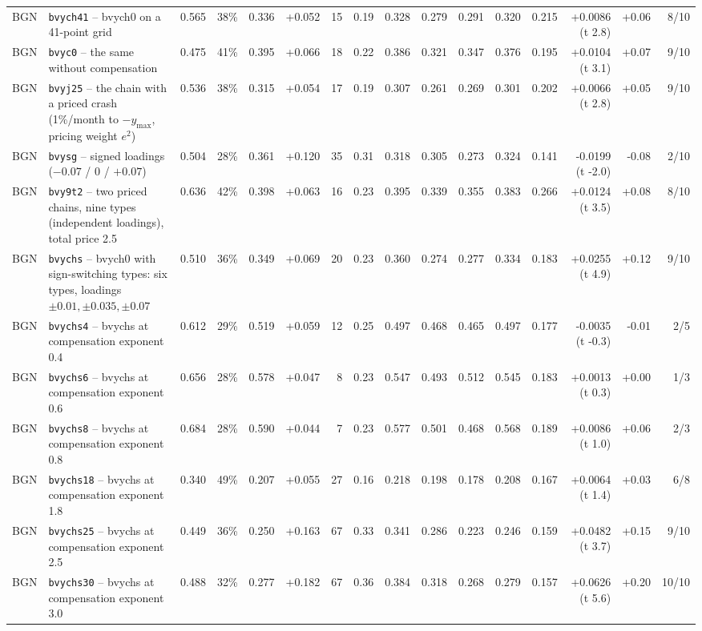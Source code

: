 \begin{landscape}
\begin{longtable}{lp{4.6cm}rrrrrrrrrrrrrr}
BGN & \texttt{bvych41} -- bvych0 on a 41-point grid & 0.565 & 38\% & 0.336 & +0.052 & 15 & 0.19 & 0.328 & 0.279 & 0.291 & 0.320 & 0.215 & +0.0086 (t 2.8) & +0.06 & 8/10 \\
BGN & \texttt{bvyc0} -- the same without compensation & 0.475 & 41\% & 0.395 & +0.066 & 18 & 0.22 & 0.386 & 0.321 & 0.347 & 0.376 & 0.195 & +0.0104 (t 3.1) & +0.07 & 9/10 \\
BGN & \texttt{bvyj25} -- the chain with a priced crash (1\%/month to $-y_{\max}$, pricing weight $e^2$) & 0.536 & 38\% & 0.315 & +0.054 & 17 & 0.19 & 0.307 & 0.261 & 0.269 & 0.301 & 0.202 & +0.0066 (t 2.8) & +0.05 & 9/10 \\
BGN & \texttt{bvysg} -- signed loadings ($-0.07$ / 0 / $+0.07$) & 0.504 & 28\% & 0.361 & +0.120 & 35 & 0.31 & 0.318 & 0.305 & 0.273 & 0.324 & 0.141 & -0.0199 (t -2.0) & -0.08 & 2/10 \\
BGN & \texttt{bvy9t2} -- two priced chains, nine types (independent loadings), total price 2.5 & 0.636 & 42\% & 0.398 & +0.063 & 16 & 0.23 & 0.395 & 0.339 & 0.355 & 0.383 & 0.266 & +0.0124 (t 3.5) & +0.08 & 8/10 \\
BGN & \texttt{bvychs} -- bvych0 with sign-switching types: six types, loadings $\pm 0.01, \pm 0.035, \pm 0.07$ & 0.510 & 36\% & 0.349 & +0.069 & 20 & 0.23 & 0.360 & 0.274 & 0.277 & 0.334 & 0.183 & +0.0255 (t 4.9) & +0.12 & 9/10 \\
BGN & \texttt{bvychs4} -- bvychs at compensation exponent 0.4 & 0.612 & 29\% & 0.519 & +0.059 & 12 & 0.25 & 0.497 & 0.468 & 0.465 & 0.497 & 0.177 & -0.0035 (t -0.3) & -0.01 & 2/5 \\
BGN & \texttt{bvychs6} -- bvychs at compensation exponent 0.6 & 0.656 & 28\% & 0.578 & +0.047 & 8 & 0.23 & 0.547 & 0.493 & 0.512 & 0.545 & 0.183 & +0.0013 (t 0.3) & +0.00 & 1/3 \\
BGN & \texttt{bvychs8} -- bvychs at compensation exponent 0.8 & 0.684 & 28\% & 0.590 & +0.044 & 7 & 0.23 & 0.577 & 0.501 & 0.468 & 0.568 & 0.189 & +0.0086 (t 1.0) & +0.06 & 2/3 \\
BGN & \texttt{bvychs18} -- bvychs at compensation exponent 1.8 & 0.340 & 49\% & 0.207 & +0.055 & 27 & 0.16 & 0.218 & 0.198 & 0.178 & 0.208 & 0.167 & +0.0064 (t 1.4) & +0.03 & 6/8 \\
BGN & \texttt{bvychs25} -- bvychs at compensation exponent 2.5 & 0.449 & 36\% & 0.250 & +0.163 & 67 & 0.33 & 0.341 & 0.286 & 0.223 & 0.246 & 0.159 & +0.0482 (t 3.7) & +0.15 & 9/10 \\
BGN & \texttt{bvychs30} -- bvychs at compensation exponent 3.0 & 0.488 & 32\% & 0.277 & +0.182 & 67 & 0.36 & 0.384 & 0.318 & 0.268 & 0.279 & 0.157 & +0.0626 (t 5.6) & +0.20 & 10/10 \\

\end{longtable}
\end{landscape}
